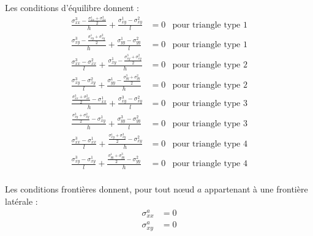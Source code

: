 Les conditions d'équilibre donnent : 
\begin{align*}
\frac{\sigma_{xx}^3 - \frac{\sigma_{xx}^1+\sigma_{xx}^2}{2}}{h} + \frac{\sigma_{xy}^1-\sigma_{xy}^2}{l}&=0 & \text{pour triangle type 1}\\
\frac{\sigma_{xy}^3 - \frac{\sigma_{xy}^1+\sigma_{xy}^2}{2}}{h} + \frac{\sigma_{yy}^1-\sigma_{yy}^2}{l}&=0& \text{pour triangle type 1}\\
\frac{\sigma_{xx}^3-\sigma_{xx}^2}{l} + \frac{\sigma_{xy}^1 - \frac{\sigma_{xy}^3+\sigma_{xy}^2}{2}}{h} &=0& \text{pour triangle type 2}\\
\frac{\sigma_{xy}^3-\sigma_{xy}^2}{l} + \frac{\sigma_{yy}^1 - \frac{\sigma_{yy}^3+\sigma_{yy}^2}{2}}{h} &=0 & \text{pour triangle type 2}\\
\frac{\frac{\sigma_{xx}^3+\sigma_{xx}^2}{2} - \sigma_{xx}^1 }{h} + \frac{\sigma_{xy}^3-\sigma_{xy}^2}{l}&=0& \text{pour triangle type 3}\\
\frac{\frac{\sigma_{xy}^3+\sigma_{xy}^2}{2} - \sigma_{xy}^1 }{h} + \frac{\sigma_{yy}^3-\sigma_{yy}^2}{l}&=0& \text{pour triangle type 3}\\
\frac{\sigma_{xx}^3-\sigma_{xx}^1}{l} + \frac{\frac{\sigma_{xy}^1+\sigma_{xy}^3}{2} - \sigma_{xy}^2 }{h} &=0 & \text{pour triangle type 4}\\
\frac{\sigma_{xy}^3-\sigma_{xy}^1}{l} + \frac{\frac{\sigma_{yy}^1+\sigma_{yy}^3}{2} - \sigma_{yy}^2 }{h} &=0 & \text{pour triangle type 4}\\
\end{align*}


Les conditions frontières donnent, pour tout nœud $a$ appartenant à une frontière latérale : 
\begin{align*}
\sigma_{xx}^a&= 0\\
 \sigma_{xy}^a &= 0  \\
\end{align*}

